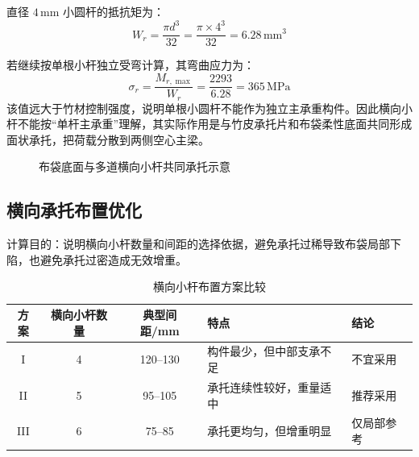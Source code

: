\documentclass[UTF8,a4paper,12pt,fontset=none]{ctexart}
\numberwithin{equation}{section}
\numberwithin{figure}{section}
\numberwithin{table}{section}
\newcommand{\mm}{\,\mathrm{mm}}
\newcommand{\MPa}{\,\mathrm{MPa}}
\begin{document}
直径 $4\mm$ 小圆杆的抵抗矩为：
\begin{equation}
  W_r=\frac{\pi d^3}{32}=\frac{\pi\times4^3}{32}=6.28\mm^3
\end{equation}

若继续按单根小杆独立受弯计算，其弯曲应力为：
\begin{equation}
  \sigma_r=\frac{M_{r,\max}}{W_r}=\frac{2293}{6.28}=365\MPa
\end{equation}
该值远大于竹材控制强度，说明单根小圆杆不能作为独立主承重构件。因此横向小杆不能按“单杆主承重”理解，其实际作用是与竹皮承托片和布袋柔性底面共同形成面状承托，把荷载分散到两侧空心主梁。

\begin{figure}[H]
\centering
{}
\caption{布袋底面与多道横向小杆共同承托示意}
\label{fig:rod-support}
\end{figure}

\subsection{横向承托布置优化}
计算目的：说明横向小杆数量和间距的选择依据，避免承托过稀导致布袋局部下陷，也避免承托过密造成无效增重。

\begin{table}[H]
\centering
\caption{横向小杆布置方案比较}
\label{tab:crossbar-layout}
\begin{tabularx}{\linewidth}{c c c Y Y}
\toprule
\textbf{方案} & \textbf{横向小杆数量} & \textbf{典型间距}/mm & \textbf{特点} & \textbf{结论} \\\midrule
I & 4 & 120--130 & 构件最少，但中部支承不足 & 不宜采用 \\
II & 5 & 95--105 & 承托连续性较好，重量适中 & 推荐采用 \\
III & 6 & 75--85 & 承托更均匀，但增重明显 & 仅局部参考 \\
\bottomrule
\end{tabularx}
\end{table}
\end{document}
